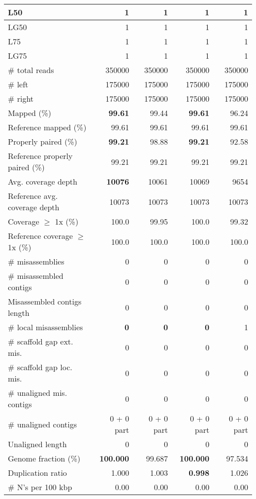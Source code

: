 \documentclass[12pt,a4paper]{article}
\begin{document}
\begin{table}[ht]
\begin{center}
\begin{tabular}{|l*{4}{|r}|}
L50 & 1 & 1 & 1 & 1 \\ \hline
LG50 & 1 & 1 & 1 & 1 \\ \hline
L75 & 1 & 1 & 1 & 1 \\ \hline
LG75 & 1 & 1 & 1 & 1 \\ \hline
\# total reads & 350000 & 350000 & 350000 & 350000 \\ \hline
\# left & 175000 & 175000 & 175000 & 175000 \\ \hline
\# right & 175000 & 175000 & 175000 & 175000 \\ \hline
Mapped (\%) & {\bf 99.61} & 99.44 & {\bf 99.61} & 96.24 \\ \hline
Reference mapped (\%) & 99.61 & 99.61 & 99.61 & 99.61 \\ \hline
Properly paired (\%) & {\bf 99.21} & 98.88 & {\bf 99.21} & 92.58 \\ \hline
Reference properly paired (\%) & 99.21 & 99.21 & 99.21 & 99.21 \\ \hline
Avg. coverage depth & {\bf 10076} & 10061 & 10069 & 9654 \\ \hline
Reference avg. coverage depth & 10073 & 10073 & 10073 & 10073 \\ \hline
Coverage $\geq$ 1x (\%) & 100.0 & 99.95 & 100.0 & 99.32 \\ \hline
Reference coverage $\geq$ 1x (\%) & 100.0 & 100.0 & 100.0 & 100.0 \\ \hline
\# misassemblies & 0 & 0 & 0 & 0 \\ \hline
\# misassembled contigs & 0 & 0 & 0 & 0 \\ \hline
Misassembled contigs length & 0 & 0 & 0 & 0 \\ \hline
\# local misassemblies & {\bf 0} & {\bf 0} & {\bf 0} & 1 \\ \hline
\# scaffold gap ext. mis. & 0 & 0 & 0 & 0 \\ \hline
\# scaffold gap loc. mis. & 0 & 0 & 0 & 0 \\ \hline
\# unaligned mis. contigs & 0 & 0 & 0 & 0 \\ \hline
\# unaligned contigs & 0 + 0 part & 0 + 0 part & 0 + 0 part & 0 + 0 part \\ \hline
Unaligned length & 0 & 0 & 0 & 0 \\ \hline
Genome fraction (\%) & {\bf 100.000} & 99.687 & {\bf 100.000} & 97.534 \\ \hline
Duplication ratio & 1.000 & 1.003 & {\bf 0.998} & 1.026 \\ \hline
\# N's per 100 kbp & 0.00 & 0.00 & 0.00 & 0.00 \\ \hline

\end{tabular}
\end{center}
\end{table}
\end{document}
